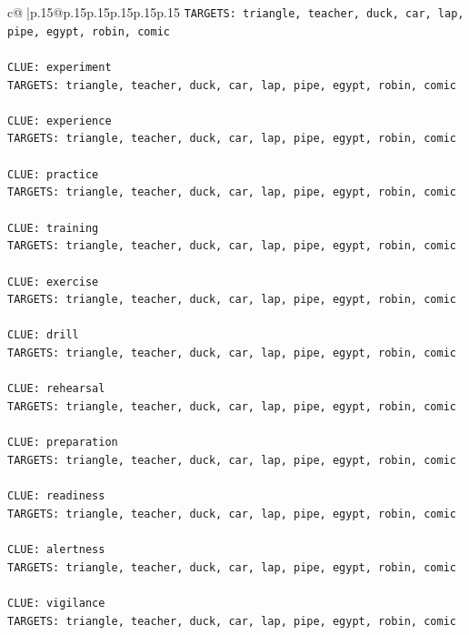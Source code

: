 \documentclass{article}
\begin{document}
{\begin{supertabular}{c@{$\;$}|p{.15\linewidth}@{}p{.15\linewidth}p{.15\linewidth}p{.15\linewidth}p{.15\linewidth}p{.15\linewidth}}
{{{\texttt{TARGETS: triangle, teacher, duck, car, lap, pipe, egypt, robin, comic} \\
\\ 
\texttt{CLUE: experiment} \\
\texttt{TARGETS: triangle, teacher, duck, car, lap, pipe, egypt, robin, comic} \\
\\ 
\texttt{CLUE: experience} \\
\texttt{TARGETS: triangle, teacher, duck, car, lap, pipe, egypt, robin, comic} \\
\\ 
\texttt{CLUE: practice} \\
\texttt{TARGETS: triangle, teacher, duck, car, lap, pipe, egypt, robin, comic} \\
\\ 
\texttt{CLUE: training} \\
\texttt{TARGETS: triangle, teacher, duck, car, lap, pipe, egypt, robin, comic} \\
\\ 
\texttt{CLUE: exercise} \\
\texttt{TARGETS: triangle, teacher, duck, car, lap, pipe, egypt, robin, comic} \\
\\ 
\texttt{CLUE: drill} \\
\texttt{TARGETS: triangle, teacher, duck, car, lap, pipe, egypt, robin, comic} \\
\\ 
\texttt{CLUE: rehearsal} \\
\texttt{TARGETS: triangle, teacher, duck, car, lap, pipe, egypt, robin, comic} \\
\\ 
\texttt{CLUE: preparation} \\
\texttt{TARGETS: triangle, teacher, duck, car, lap, pipe, egypt, robin, comic} \\
\\ 
\texttt{CLUE: readiness} \\
\texttt{TARGETS: triangle, teacher, duck, car, lap, pipe, egypt, robin, comic} \\
\\ 
\texttt{CLUE: alertness} \\
\texttt{TARGETS: triangle, teacher, duck, car, lap, pipe, egypt, robin, comic} \\
\\ 
\texttt{CLUE: vigilance} \\
\texttt{TARGETS: triangle, teacher, duck, car, lap, pipe, egypt, robin, comic} \\
}}}
\end{supertabular}}
\end{document}
